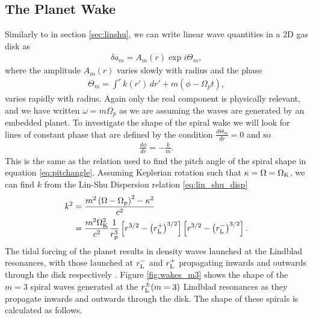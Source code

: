 \subsection{The Planet Wake} \label{sec:planetwake}


Similarly to in section \ref{sec:linshu}, we can write linear wave quantities in a 2D gas disk as 
\begin{align}
    \delta a_m = A_m(r) \exp{i \Theta_m},
\end{align}
where the amplitude $A_m(r)$ varies slowly with radius and the phase
\begin{align}
    \Theta_m = \int^r k(r') \, dr' + m (\phi - \Omega_p t),
\end{align}
varies rapidly with radius. 
Again only the real component is physically relevant, and we have written $\omega = m \Omega_p$ as we are assuming the waves are generated by an embedded planet.
To investigate the shape of the spiral wake we will look for lines of constant phase that are defined by the condition $\frac{d\Theta_m}{dr} = 0$ and so 
\begin{align}
    \frac{d\phi}{dr} = - \frac{k}{m}. \label{eq:spiral_km}
\end{align}
This is the same as the relation used to find the pitch angle of the spiral shape in equation \ref{eq:pitchangle}.
Assuming Keplerian rotation such that $\kappa=\Omega=\Omega_{\rm K}$, we can find $k$ from the Lin-Shu Dispersion relation \ref{eq:lin_shu_disp}
\begin{align}
    k^2 &= \frac{m^2 \left( \Omega - \Omega_{\rm p} \right)^2 - \kappa^2}{c^2} \\
    &= \frac{m^2 \Omega_{\rm K}^2}{c^2} \frac{1}{r_{\rm p}^3} \left[ r^{3/2} - \left( r_{\rm L}^+ \right)^{3/2} \right] \left[ r^{3/2} - \left( r_{\rm L}^- \right)^{3/2} \right].
\end{align}
The tidal forcing of the planet results in density waves launched at the Lindblad resonances, with those launched at $r_{\rm L}^-$ and $r_{\rm L}^+$ propagating inwards and outwards through the disk respectively \citep{goldreich1978,goldreich1979}.
Figure \ref{fig:wakes_m3} shows the shape of the $m=3$ spiral waves generated at the $r_{\rm L}^\pm (m=3)$ Lindblad resonances as they propagate inwards and outwards through the disk.
The shape of these spirals is calculated as follows.
